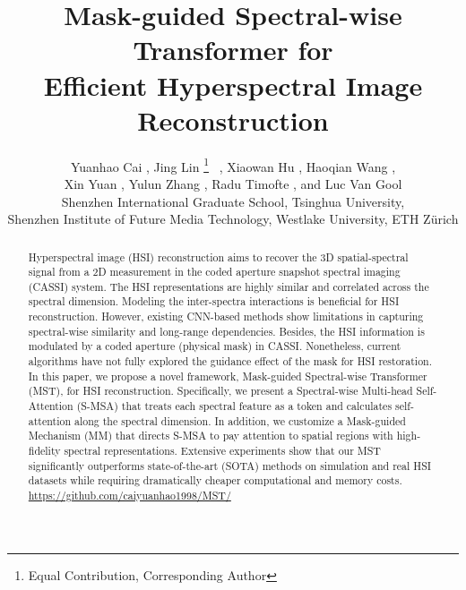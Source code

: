 \documentclass[10pt,twocolumn,letterpaper]{article}
\begin{document}
\title{Mask-guided Spectral-wise Transformer for \\ Efficient Hyperspectral Image Reconstruction}
\vspace{-3mm}
\author{Yuanhao Cai , Jing Lin \thanks{Equal Contribution,  Corresponding Author} ~, Xiaowan Hu , Haoqian Wang , \\ Xin Yuan , Yulun Zhang , Radu Timofte , and Luc Van Gool  \\
	 Shenzhen International Graduate School, Tsinghua University, \\   Shenzhen Institute of Future Media Technology,  Westlake University,  ETH Z\"{u}rich
}
\maketitle

\begin{abstract}
\vspace{-2mm}
Hyperspectral image (HSI) reconstruction aims to recover the 3D spatial-spectral signal from a 2D measurement in the coded aperture snapshot spectral imaging  (CASSI) system. The HSI  representations are highly similar and correlated across the spectral dimension. Modeling the inter-spectra interactions is beneficial for HSI reconstruction. However, existing CNN-based methods show limitations in capturing spectral-wise similarity and long-range dependencies. Besides, the HSI information is modulated by a coded aperture (physical mask) in CASSI. Nonetheless, current algorithms have not fully explored the guidance effect of the mask for HSI restoration. In this paper, we propose a novel framework, Mask-guided Spectral-wise Transformer (MST), for HSI reconstruction. Specifically, we present a Spectral-wise Multi-head Self-Attention (S-MSA) that treats each spectral feature as a token and calculates self-attention along the spectral dimension. In addition, we customize a Mask-guided Mechanism (MM) that directs S-MSA to pay attention to spatial regions with high-fidelity spectral representations. Extensive experiments show that our MST significantly outperforms state-of-the-art (SOTA) methods on simulation and real HSI datasets while requiring dramatically cheaper computational and memory costs. \url{https://github.com/caiyuanhao1998/MST/}
\end{abstract}

\vspace{-4mm}
\end{document}
